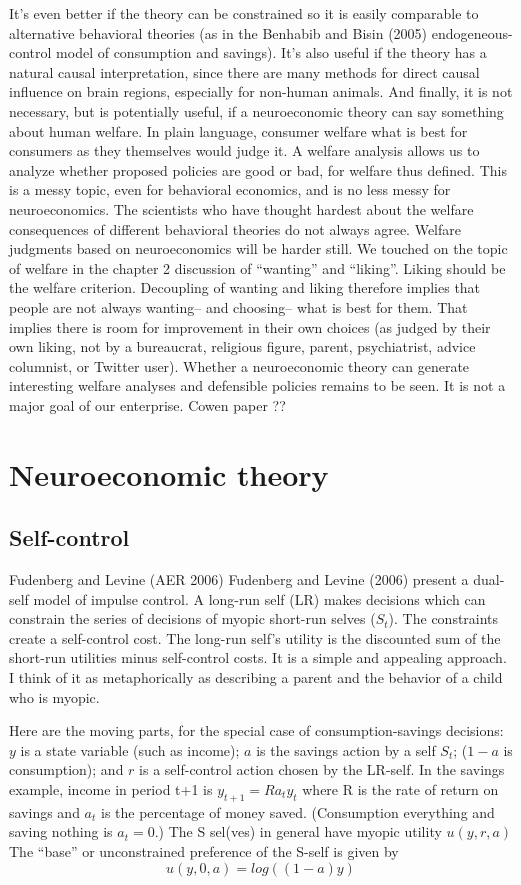 \documentclass{article}
\begin{document}
It’s even better if the theory can be constrained so it is easily comparable to alternative behavioral theories (as in the Benhabib and Bisin (2005) endogeneous-control model of consumption and savings). It’s also useful if the theory has a natural causal interpretation, since there are many methods for direct causal influence on brain regions, especially for non-human animals. 
And finally, it is not necessary, but is potentially useful, if a neuroeconomic theory can say something about human welfare. In plain language, consumer welfare what is best for consumers as they themselves would judge it. A welfare analysis allows us to analyze whether proposed policies are good or bad, for welfare thus defined. This is a messy topic, even for behavioral economics, and is no less messy for neuroeconomics. The scientists who have thought hardest about the welfare consequences of different behavioral theories do not always agree. Welfare judgments based on neuroeconomics will be harder still. 
We touched on the topic of welfare in the chapter 2 discussion of “wanting” and “liking”. Liking should be the welfare criterion. Decoupling of wanting and liking therefore implies that people are not always wanting-- and choosing-- what is best for them. That implies there is room for improvement in their own choices (as judged by their own liking, not by a bureaucrat, religious figure, parent, psychiatrist, advice columnist, or Twitter user). Whether a neuroeconomic theory can generate interesting welfare analyses and defensible policies remains to be seen. It is not a major goal of our enterprise. 
Cowen paper ??
\section{Neuroeconomic theory} 
\subsection{Self-control}
Fudenberg and Levine (AER 2006) 
Fudenberg and Levine (2006) present a dual-self model of impulse control. A long-run self (LR) makes decisions which can constrain the series of  decisions of myopic  short-run selves ($S_t$). The constraints create a self-control cost. The long-run self’s utility is the discounted sum of the short-run utilities minus self-control costs. 
It is a simple and appealing approach. I think of it as metaphorically as describing a parent and the behavior of a child who is myopic. 

Here are the moving parts, for the special case of consumption-savings decisions: $y$ is a state variable (such as income); $a$ is the savings action by a self $S_t$; ($1-a$ is consumption); and $r$ is a self-control action chosen by the LR-self. In the savings example, income in period t+1 is $y_{t+1}=Ra_ty_t$ where R is the rate of return on savings and $a_t$ is the percentage of money saved. (Consumption everything and saving nothing is $a_t=0$.) 
The S sel(ves) in general have myopic utility $u(y,r,a)$ The “base” or unconstrained preference of the S-self is given by 
\[
u(y,0,a) = log((1-a)y)
\]
\end{document}
